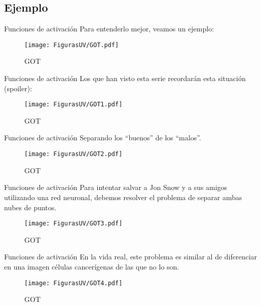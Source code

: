 \documentclass[10pt]{beamer}
\begin{document}
\subsection{Ejemplo}
\begin{frame}{Funciones de activación}
Para entenderlo mejor, veamos un ejemplo:

\begin{figure}[h!]
  \centering
  \texttt{[image: FigurasUV/GOT.pdf]}
  \caption{GOT}
\end{figure}

\end{frame}

\begin{frame}{Funciones de activación}
Los que han visto esta serie recordarán esta situación (spoiler):

\begin{figure}[h!]
  \centering
  \texttt{[image: FigurasUV/GOT1.pdf]}
  \caption{GOT}
\end{figure}

\end{frame}

\begin{frame}{Funciones de activación}
Separando los ``buenos'' de los ``malos''.

\begin{figure}[h!]
  \centering
  \texttt{[image: FigurasUV/GOT2.pdf]}
  \caption{GOT}
\end{figure}

\end{frame}

\begin{frame}{Funciones de activación}
Para intentar salvar a Jon Snow y a sus amigos utilizando una red neuronal, debemos resolver el problema de separar ambas nubes de puntos.

\begin{figure}[h!]
  \centering
  \texttt{[image: FigurasUV/GOT3.pdf]}
  \caption{GOT}
\end{figure}

\end{frame}

\begin{frame}{Funciones de activación}
En la vida real, este problema es similar al de diferenciar en una imagen células cancerígenas de las que no lo son.

\begin{figure}[h!]
  \centering
  \texttt{[image: FigurasUV/GOT4.pdf]}
  \caption{GOT}
\end{figure}

\end{frame}
\end{document}

